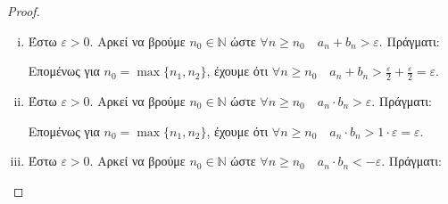 \begin{proof}
  \begin{enumerate}[i)]
    \item Έστω $ \varepsilon >0 $. Αρκεί να βρούμε $ n_{0} \in \mathbb{N} $ ώστε 
      $ \forall n \geq n_{0} \quad a_{n}+b_{n} > \varepsilon $. Πράγματι:
      Επομένως για $ n_{0}= \max \{ n_{1}, n_{2} \} $, έχουμε ότι $ \forall n \geq n_{0}
      \quad a_{n}+ b_{n} > \frac{\varepsilon}{2} + \frac{\varepsilon}{2} = 
      \varepsilon $. 
    \item Έστω $ \varepsilon >0 $. Αρκεί να βρούμε $ n_{0} \in \mathbb{N} $ ώστε 
      $ \forall n \geq n_{0} \quad a_{n}\cdot b_{n} > \varepsilon $. Πράγματι:
      Επομένως για $ n_{0}= \max \{ n_{1}, n_{2} \} $, έχουμε ότι $ \forall n \geq n_{0}
      \quad a_{n}\cdot b_{n} > 1 \cdot \varepsilon = \varepsilon $. 
    \item Έστω $ \varepsilon >0 $. Αρκεί να βρούμε $ n_{0} \in \mathbb{N} $ ώστε 
      $ \forall n \geq n_{0} \quad a_{n}\cdot b_{n} < - \varepsilon $. Πράγματι:
\end{enumerate}
\end{proof}
